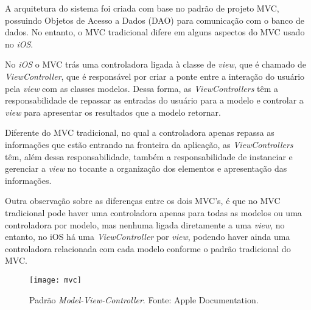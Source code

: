 A arquitetura do sistema foi criada com base no padrão de projeto MVC, possuindo Objetos de Acesso a Dados (DAO) para comunicação 
com o banco de dados. No entanto, o MVC tradicional difere em alguns aspectos do MVC usado no \textit{iOS}. 

No \textit{iOS} o MVC trás uma controladora ligada à classe de \textit{view}, que é chamado de \textit{ViewController}, que é responsável por 
criar a ponte entre a interação do usuário pela \textit{view} com as classes modelos. Dessa forma, as \textit{ViewControllers} têm a 
responsabilidade de repassar as entradas do usuário para a modelo e controlar a \textit{view} para apresentar os resultados que a modelo retornar.


Diferente do MVC tradicional, no qual a controladora apenas repassa as informações que estão entrando na fronteira da aplicação, 
as \textit{ViewControllers} têm, além dessa responsabilidade, também a responsabilidade de instanciar e gerenciar a \textit{view} no tocante
a organização dos elementos e apresentação das informações.


Outra observação sobre as diferenças entre os dois MVC's, é que no MVC tradicional pode haver uma controladora apenas 
para todas as modelos ou uma controladora por modelo, mas nenhuma ligada diretamente a uma \textit{view}, no entanto, no iOS há uma 
\textit{ViewController} por \textit{view}, podendo haver ainda uma controladora relacionada com cada modelo conforme o padrão tradicional do MVC.


\begin{figure}[h]
  \centering
    \texttt{[image: mvc]}
    \caption[Padrão \textit{Model-View-Controller}]{ Padrão \textit{Model-View-Controller}. Fonte: Apple Documentation.}
	\label{fig:mvc}
\end{figure}

